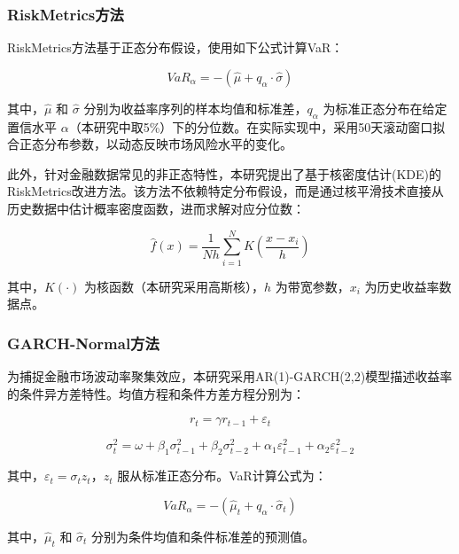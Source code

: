 \documentclass[12pt, a4paper]{article}
\begin{document}
\subsubsection{RiskMetrics方法}
RiskMetrics方法基于正态分布假设，使用如下公式计算VaR：

\begin{equation}
VaR_{\alpha} = -(\hat{\mu} + q_{\alpha} \cdot \hat{\sigma})
\end{equation}

其中，$\hat{\mu}$ 和 $\hat{\sigma}$ 分别为收益率序列的样本均值和标准差，$q_{\alpha}$ 为标准正态分布在给定置信水平 $\alpha$（本研究中取5\%）下的分位数。在实际实现中，采用50天滚动窗口拟合正态分布参数，以动态反映市场风险水平的变化。

此外，针对金融数据常见的非正态特性，本研究提出了基于核密度估计(KDE)的RiskMetrics改进方法。该方法不依赖特定分布假设，而是通过核平滑技术直接从历史数据中估计概率密度函数，进而求解对应分位数：

\begin{equation}
\hat{f}(x) = \frac{1}{Nh} \sum_{i=1}^{N} K\left(\frac{x-x_i}{h}\right)
\end{equation}

其中，$K(\cdot)$ 为核函数（本研究采用高斯核），$h$ 为带宽参数，$x_i$ 为历史收益率数据点。

\subsubsection{GARCH-Normal方法}
为捕捉金融市场波动率聚集效应，本研究采用AR(1)-GARCH(2,2)模型描述收益率的条件异方差特性。均值方程和条件方差方程分别为：

\begin{equation}
r_t = \gamma r_{t-1} + \varepsilon_t
\end{equation}

\begin{equation}
\sigma_t^2 = \omega + \beta_1 \sigma_{t-1}^2 + \beta_2 \sigma_{t-2}^2 + \alpha_1 \varepsilon_{t-1}^2 + \alpha_2 \varepsilon_{t-2}^2
\end{equation}

其中，$\varepsilon_t = \sigma_t z_t$，$z_t$ 服从标准正态分布。VaR计算公式为：

\begin{equation}
VaR_{\alpha} = -(\hat{\mu}_t + q_{\alpha} \cdot \hat{\sigma}_t)
\end{equation}

其中，$\hat{\mu}_t$ 和 $\hat{\sigma}_t$ 分别为条件均值和条件标准差的预测值。
\end{document}
